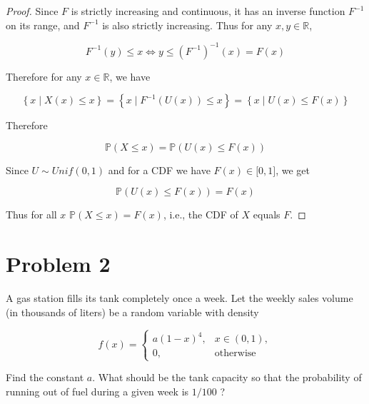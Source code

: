 \documentclass{qlnotes-export}
\begin{document}
\begin{proof}

Since \(F\) is strictly increasing and continuous, it has an inverse function \(F^{- 1}\) on its range, and \(F^{- 1}\) is also strictly increasing. Thus for any \(x,y \in {\mathbb{R}}\),

\[F^{- 1}(y) \leq x\Leftrightarrow y \leq (F^{- 1})^{- 1}(x) = F(x)\]

Therefore for any \(x \in {\mathbb{R}}\), we have

\[\left\{ {x \mid X(x) \leq x} \right\} = \left\{ {x \mid F^{- 1}(U(x)) \leq x} \right\} = \left\{ {x \mid U(x) \leq F(x)} \right\}\]

Therefore

\[{\mathbb{P}}(X \leq x) = {\mathbb{P}}(U(x) \leq F(x))\]

Since \(U \sim Unif(0,1)\) and for a CDF we have \(F(x) \in \lbrack 0,1\rbrack\), we get

\[{\mathbb{P}}(U(x) \leq F(x)) = F(x)\]

Thus for all \(x\) \({\mathbb{P}}(X \leq x) = F(x)\), i.e., the CDF of \(X\) equals \(F\).

\end{proof}

\section{Problem 2}\label{problem-2-2}

A gas station fills its tank completely once a week. Let the weekly sales volume (in thousands of liters) be a random variable with density

\[f(x) = \left\{ \begin{matrix}
{a(1 - x)^{4},} & {x \in (0,1),} \\
{0,} & \text{otherwise}
\end{matrix} \right.\]

Find the constant \(a\). What should be the tank capacity so that the probability of running out of fuel during a given week is \(1/100\) ?
\end{document}
